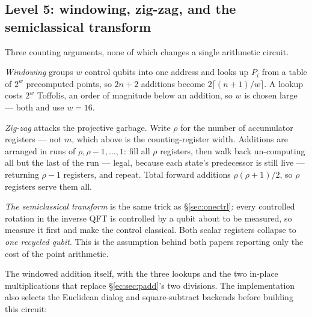 \documentclass[11pt]{article}
\theoremstyle{plain}
\theoremstyle{remark}
\begin{document}
\subsection{Level 5: windowing, zig-zag, and the semiclassical transform}\label{ec:sec:window}

Three counting arguments, none of which changes a single arithmetic circuit.

\emph{Windowing} \cite{ec:gidney-ekera} groups $w$ control qubits into one address and looks up
$P_i$ from a table of $2^w$ precomputed points, so $2n+2$ additions become $2\lceil (n{+}1)/w\rceil$.
A lookup costs $2^w$ Toffolis, an order of magnitude below an addition, so $w$ is chosen large ---
both \cite{ec:schrott26} and \cite{ec:babbush26} use $w=16$.

\emph{Zig-zag} \cite{ec:grassl16} attacks the projective garbage. Write $\rho$ for the number of
accumulator registers --- not $m$, which above is the counting-register width. Additions are
arranged in runs of $\rho, \rho-1, \dots, 1$: fill all $\rho$ registers, then walk back
un-computing all but the last of the run --- legal, because each state's predecessor is still live
--- returning $\rho-1$ registers, and repeat. Total forward additions $\rho(\rho+1)/2$, so $\rho$
registers serve them all.

\emph{The semiclassical transform} \cite{ec:griffiths-niu} is the same trick as
\S\ref{sec:onectrl}: every controlled rotation in the inverse QFT is controlled by a qubit about to
be measured, so measure it first and make the control classical. Both scalar registers collapse to
\emph{one recycled qubit}. This is the assumption behind both papers reporting only the cost of the
point arithmetic.

The windowed addition itself, with the three lookups and the two in-place multiplications that
replace \S\ref{ec:sec:padd}'s two divisions. The implementation also selects the
Euclidean dialog and square-subtract backends before building this circuit:
\end{document}
